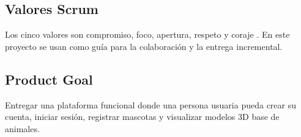 \subsection{Valores Scrum}
Los cinco valores son compromiso, foco, apertura, respeto y coraje \cite{schwaber2020}. En este proyecto se usan como gu\'ia para la colaboraci\'on y la entrega incremental.

\subsection{Product Goal}
Entregar una plataforma funcional donde una persona usuaria pueda crear su cuenta, iniciar sesi\'on, registrar mascotas y visualizar modelos 3D base de animales.
